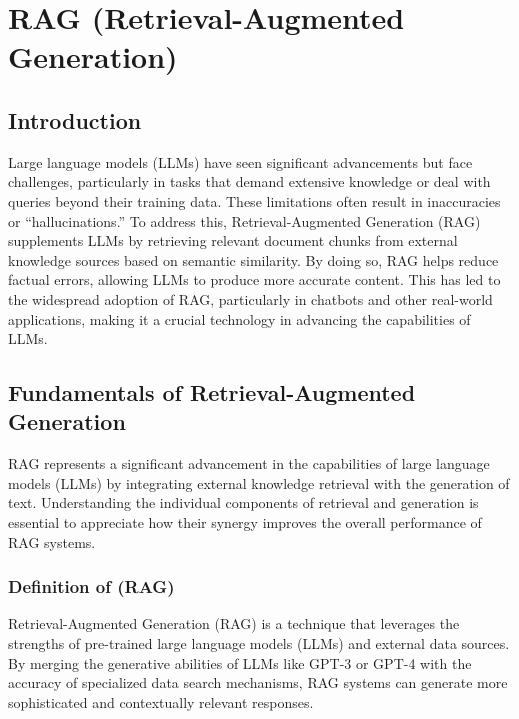 \chapter{RAG (Retrieval-Augmented Generation)}
\pagestyle{fancy}
\pagestyle{fancy}\chead{} \pagestyle{fancy}\rhead{}
\pagestyle{fancy} 
\pagestyle{fancy}\cfoot{} \pagestyle{fancy}\rfoot{\thepage}
\section{ Introduction}\label{start2}

Large language models (LLMs) have seen significant advancements but face challenges, particularly in tasks that demand extensive knowledge or deal with queries beyond their training data. These limitations often result in inaccuracies or “hallucinations.” To address this, Retrieval-Augmented Generation (RAG) supplements LLMs by retrieving relevant document chunks from external knowledge sources based on semantic similarity. By doing so, RAG helps reduce factual errors, allowing LLMs to produce more accurate content. This has led to the widespread adoption of RAG, particularly in chatbots and other real-world applications, making it a crucial technology in advancing the capabilities of LLMs.
\section{Fundamentals of Retrieval-Augmented Generation}
RAG represents a significant advancement in the capabilities of large language models (LLMs) by integrating external knowledge retrieval with the generation of text. Understanding the individual components of retrieval and generation is essential to appreciate how their synergy improves the overall performance of RAG systems.
\subsection{Definition of (RAG)}
Retrieval-Augmented Generation (RAG) is a technique that leverages the strengths of pre-trained large language models (LLMs) and external data sources. By merging the generative abilities of LLMs like GPT-3 or GPT-4 with the accuracy of specialized data search mechanisms, RAG systems can generate more sophisticated and contextually relevant responses\cite{selvaraj2024}.
